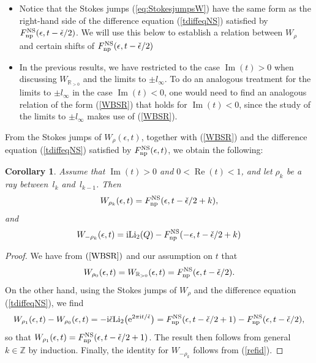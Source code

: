 \documentclass[pdftex]{sigma}
\numberwithin{equation}{section}
\newtheorem{Corollary}[Theorem]{Corollary}
\begin{document}
\begin{Remark}\quad
\begin{itemize}\itemsep=0pt
 \item Notice that the Stokes jumps (\ref{eq:StokesjumpsW}) have the same form as the right-hand side of the difference equation (\ref{tdiffeqNS}) satisfied by $F_{{\rm np}}^{\rm NS}(\epsilon,t-\check\epsilon/2)$. We will use this below to establish a relation between $W_{\rho}$ and certain shifts of $F_{{\rm np}}^{\rm NS}(\epsilon,t-\check\epsilon/2)$
 \item In the previous results, we have restricted to the case $\operatorname{Im}(t)>0$ when discussing $W_{\mathbb{R}_{>0}}$ and the limits to $\pm l_{\infty}$. To do an analogous treatment for the limits to $\pm l_{\infty}$ in the case $\operatorname{Im}(t)<0$, one would need to find an analogous relation of the form (\ref{WBSR}) that holds for $\operatorname{Im}(t)<0$, since the study of the limits to $\pm l_{\infty}$ makes use of (\ref{WBSR}).
\end{itemize}

\end{Remark}


From the Stokes jumps of $W_{\rho}(\epsilon,t)$, together with (\ref{WBSR}) and the difference equation (\ref{tdiffeqNS}) satisfied by $F^{\rm NS}_{{\rm np}}(\epsilon,t)$, we obtain the following:

\begin{Corollary}\label{cortheorem1}
Assume that $\operatorname{Im}(t)>0$ and $0<\operatorname{Re}(t)<1$, and let $\rho_k$ be a ray between~$l_k$ and~$l_{k-1}$. Then
\begin{equation*}
 W_{\rho_k}(\epsilon,t)=F_{{\rm np}}^{\rm NS}(\epsilon,t-\check\epsilon/2 +k),
\end{equation*}
and
\begin{equation*}
 W_{-\rho_k}(\epsilon,t)=\mathrm{i}\mathrm{Li}_2(Q)-F_{{\rm np}}^{\rm NS}(-\epsilon,t-\check\epsilon/2+k)
\end{equation*}
\end{Corollary}
\begin{proof}
We have from $(\ref{WBSR})$ and our assumption on $t$ that
\begin{equation*}
 W_{\rho_0}(\epsilon,t)=W_{\mathbb{R}_{>0}}(\epsilon,t)=F_{{\rm np}}^{\rm NS}(\epsilon,t-\check\epsilon/2).
\end{equation*}
On the other hand, using the Stokes jumps of $W_{\rho}$ and the difference equation (\ref{tdiffeqNS}), we find
\begin{equation*}
 W_{\rho_1}(\epsilon,t)-W_{\rho_0}(\epsilon,t)=-\mathrm{i}\check\epsilon \mathrm{Li}_2\big({\rm e}^{2\pi {\rm i}t/\check\epsilon}\big)=F_{{\rm np}}^{\rm NS}(\epsilon,t-\check\epsilon/2+1)-F_{{\rm np}}^{\rm NS}(\epsilon,t-\check\epsilon/2),
\end{equation*}
so that $W_{\rho_1}(\epsilon,t)=F_{{\rm np}}^{\rm NS}(\epsilon,t-\check\epsilon/2+1)$. The result then follows from general $k\in \mathbb{Z}$ by induction. Finally, the identity for $W_{-\rho_k}$ follows from (\ref{refid}).
\end{proof}
\end{document}
